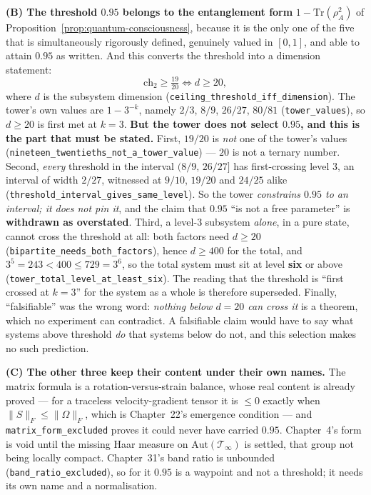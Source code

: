\begin{remark}
\textbf{(B) The threshold $0.95$ belongs to the entanglement form}
$1 - \mathrm{Tr}(\rho_A^2)$ of Proposition~\ref{prop:quantum-consciousness},
because it is the only one of the five that is simultaneously rigorously
defined, genuinely valued in $[0,1]$, and able to attain $0.95$ as written. And
this converts the threshold into a dimension statement:
\[
  \text{ch}_2 \ge \tfrac{19}{20} \iff d \ge 20,
\]
where $d$ is the subsystem dimension
(\texttt{ceiling\_threshold\_iff\_dimension}). The tower's own values are
$1 - 3^{-k}$, namely $2/3$, $8/9$, $26/27$, $80/81$ (\texttt{tower\_values}), so
$d \ge 20$ is first met at $k = 3$. \textbf{But the tower does not select
$0.95$, and this is the part that must be stated.} First, $19/20$ is \emph{not}
one of the tower's values (\texttt{nineteen\_twentieths\_not\_a\_tower\_value})
--- $20$ is not a ternary number. Second, \emph{every} threshold in the interval
$(8/9,\,26/27]$ has first-crossing level $3$, an interval of width $2/27$,
witnessed at $9/10$, $19/20$ and $24/25$ alike
(\texttt{threshold\_interval\_gives\_same\_level}). So the tower
\emph{constrains $0.95$ to an interval; it does not pin it}, and the claim that
$0.95$ ``is not a free parameter'' is \textbf{withdrawn as overstated}. Third,
a level-$3$ subsystem \emph{alone}, in a pure state, cannot cross the threshold
at all: both factors need $d \ge 20$
(\texttt{bipartite\_needs\_both\_factors}), hence $d \ge 400$ for the total, and
$3^5 = 243 < 400 \le 729 = 3^6$, so the total system must sit at level
\textbf{six} or above (\texttt{tower\_total\_level\_at\_least\_six}). The
reading that the threshold is ``first crossed at $k=3$'' for the system as a
whole is therefore superseded. Finally, ``falsifiable'' was the wrong word:
\emph{nothing below $d = 20$ can cross it} is a theorem, which no experiment can
contradict. A falsifiable claim would have to say what systems above threshold
\emph{do} that systems below do not, and this selection makes no such
prediction.

\textbf{(C) The other three keep their content under their own names.} The
matrix formula is a rotation-versus-strain balance, whose real content is
already proved --- for a traceless velocity-gradient tensor it is
$\le 0$ exactly when $\|S\|_F \le \|\Omega\|_F$, which is Chapter~22's emergence
condition --- and \texttt{matrix\_form\_excluded} proves it could never have
carried $0.95$. Chapter~4's form is void until the missing Haar measure on
$\mathrm{Aut}(\mathcal{T}_\infty)$ is settled, that group not being locally
compact. Chapter~31's band ratio is unbounded
(\texttt{band\_ratio\_excluded}), so for it $0.95$ is a waypoint and not a
threshold; it needs its own name and a normalisation.


\end{remark}
